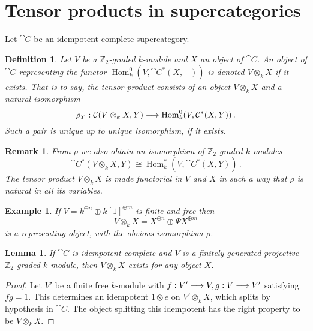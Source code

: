 \documentclass[english,letter paper,12pt,leqno]{article}
\newtheorem{lemma}[theorem]{Lemma}
\theoremstyle{example}
\newtheorem{definition}[theorem]{Definition}
\newtheorem{example}[theorem]{Example}
\newtheorem{remark}[theorem]{Remark}
\numberwithin{equation}{section}
\def\Hom{\operatorname{Hom}}
\begin{document}

\appendix

\section{Tensor products in supercategories}\label{section:tensorproduct_supcat}

Let $\cat{C}$ be an idempotent complete supercategory.

\begin{definition} Let $V$ be a $\mathbb{Z}_2$-graded $k$-module and $X$ an object of $\cat{C}$. An object of $\cat{C}$ representing the functor $\Hom^0_k( V, \cat{C}^*(X, -))$ is denoted $V \otimes_k X$ if it exists. That is to say, the tensor product consists of an object $V \otimes_k X$ and a natural isomorphism
\[
\rho_Y: \cat{C}( V \otimes_k X, Y ) \lto \Hom^0_k( V, \cat{C}^*(X,Y) )\,.
\]
Such a pair is unique up to unique isomorphism, if it exists.
\end{definition}

\begin{remark} 
From $\rho$ we also obtain an isomorphism of $\mathbb{Z}_2$-graded $k$-modules
\[
\cat{C}^*( V \otimes_k X, Y ) \cong \Hom_k^*( V, \cat{C}^*(X,Y) )\,.
\]
The tensor product $V \otimes_k X$ is made functorial in $V$ and $X$ in such a way that $\rho$ is natural in all its variables.
\end{remark}

\begin{example} If $V = k^{\oplus n} \oplus k[1]^{\oplus m}$ is finite and free then
\[
V \otimes_k X = X^{\oplus n} \oplus \Psi X ^{\oplus m}
\]
is a representing object, with the obvious isomorphism $\rho$.
\end{example}

\begin{lemma} If $\cat{C}$ is idempotent complete and $V$ is a finitely generated projective $\mathbb{Z}_2$-graded $k$-module, then $V \otimes_k X$ exists for any object $X$.
\end{lemma}
\begin{proof}
Let $V'$ be a finite free $k$-module with $f: V' \longrightarrow V, g: V \longrightarrow V'$ satisfying $fg = 1$. This determines an idempotent $1 \otimes e$ on $V' \otimes_k X$, which splits by hypothesis in $\cat{C}$. The object splitting this idempotent has the right property to be $V \otimes_k X$.
\end{proof}
\end{document}
